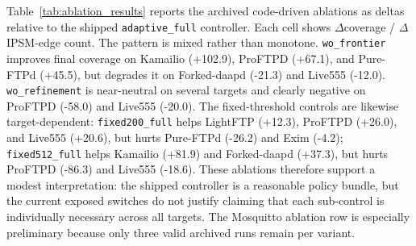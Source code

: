 \documentclass[conference]{IEEEtran}
\begin{document}
Table~\ref{tab:ablation_results} reports the archived code-driven ablations as deltas relative to the shipped \texttt{adaptive\_full} controller. Each cell shows $\Delta$coverage / $\Delta$IPSM-edge count. The pattern is mixed rather than monotone. \texttt{wo\_frontier} improves final coverage on Kamailio (+102.9), ProFTPD (+67.1), and Pure-FTPd (+45.5), but degrades it on Forked-daapd (-21.3) and Live555 (-12.0). \texttt{wo\_refinement} is near-neutral on several targets and clearly negative on ProFTPD (-58.0) and Live555 (-20.0). The fixed-threshold controls are likewise target-dependent: \texttt{fixed200\_full} helps LightFTP (+12.3), ProFTPD (+26.0), and Live555 (+20.6), but hurts Pure-FTPd (-26.2) and Exim (-4.2); \texttt{fixed512\_full} helps Kamailio (+81.9) and Forked-daapd (+37.3), but hurts ProFTPD (-86.3) and Live555 (-18.6). These ablations therefore support a modest interpretation: the shipped controller is a reasonable policy bundle, but the current exposed switches do not justify claiming that each sub-control is individually necessary across all targets. The Mosquitto ablation row is especially preliminary because only three valid archived runs remain per variant.
\end{document}
